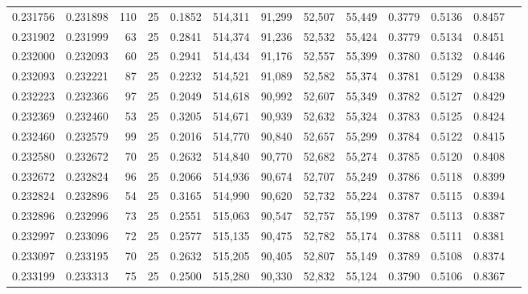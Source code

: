 \begin{tabular}{rrrrrrrrrrrrr}
0.231756 & 0.231898 &   110 &  25 &                                     0.1852 & 514,311 &  91,299 &  52,507 &  55,449 & 0.3779 & 0.5136 & 0.8457 \\
0.231902 & 0.231999 &    63 &  25 &                                     0.2841 & 514,374 &  91,236 &  52,532 &  55,424 & 0.3779 & 0.5134 & 0.8451 \\
0.232000 & 0.232093 &    60 &  25 &                                     0.2941 & 514,434 &  91,176 &  52,557 &  55,399 & 0.3780 & 0.5132 & 0.8446 \\
0.232093 & 0.232221 &    87 &  25 &                                     0.2232 & 514,521 &  91,089 &  52,582 &  55,374 & 0.3781 & 0.5129 & 0.8438 \\
0.232223 & 0.232366 &    97 &  25 &                                     0.2049 & 514,618 &  90,992 &  52,607 &  55,349 & 0.3782 & 0.5127 & 0.8429 \\
0.232369 & 0.232460 &    53 &  25 &                                     0.3205 & 514,671 &  90,939 &  52,632 &  55,324 & 0.3783 & 0.5125 & 0.8424 \\
0.232460 & 0.232579 &    99 &  25 &                                     0.2016 & 514,770 &  90,840 &  52,657 &  55,299 & 0.3784 & 0.5122 & 0.8415 \\
0.232580 & 0.232672 &    70 &  25 &                                     0.2632 & 514,840 &  90,770 &  52,682 &  55,274 & 0.3785 & 0.5120 & 0.8408 \\
0.232672 & 0.232824 &    96 &  25 &                                     0.2066 & 514,936 &  90,674 &  52,707 &  55,249 & 0.3786 & 0.5118 & 0.8399 \\
0.232824 & 0.232896 &    54 &  25 &                                     0.3165 & 514,990 &  90,620 &  52,732 &  55,224 & 0.3787 & 0.5115 & 0.8394 \\
0.232896 & 0.232996 &    73 &  25 &                                     0.2551 & 515,063 &  90,547 &  52,757 &  55,199 & 0.3787 & 0.5113 & 0.8387 \\
0.232997 & 0.233096 &    72 &  25 &                                     0.2577 & 515,135 &  90,475 &  52,782 &  55,174 & 0.3788 & 0.5111 & 0.8381 \\
0.233097 & 0.233195 &    70 &  25 &                                     0.2632 & 515,205 &  90,405 &  52,807 &  55,149 & 0.3789 & 0.5108 & 0.8374 \\
0.233199 & 0.233313 &    75 &  25 &                                     0.2500 & 515,280 &  90,330 &  52,832 &  55,124 & 0.3790 & 0.5106 & 0.8367 \\

\end{tabular}

